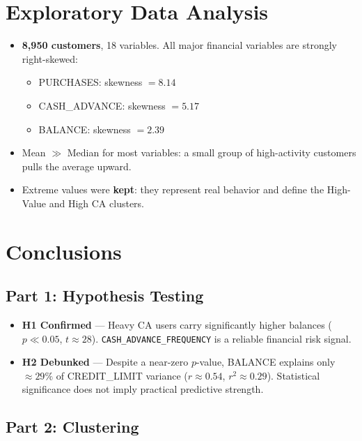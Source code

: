 \documentclass[12pt, letterpaper]{article}
\begin{document}
\section{Exploratory Data Analysis}

\begin{itemize}
  \item \textbf{8{,}950 customers}, 18 variables. All major financial variables
    are strongly right-skewed:
    \begin{itemize}
      \item PURCHASES: skewness $= 8.14$
      \item CASH\_ADVANCE: skewness $= 5.17$
      \item BALANCE: skewness $= 2.39$
    \end{itemize}
  \item Mean $\gg$ Median for most variables: a small group of high-activity
    customers pulls the average upward.
  \item Extreme values were \textbf{kept}: they represent real behavior and
    define the High-Value and High CA clusters.
\end{itemize}

\section{Conclusions}

\subsection{Part 1: Hypothesis Testing}

\begin{itemize}
  \item \textbf{H1 Confirmed} --- Heavy CA users carry significantly higher balances
    ($p \ll 0.05$, $t\approx28$). \texttt{CASH\_ADVANCE\_FREQUENCY} is a reliable
    financial risk signal.
  \item \textbf{H2 Debunked} --- Despite a near-zero $p$-value, BALANCE explains
    only $\approx29\%$ of CREDIT\_LIMIT variance ($r\approx0.54$, $r^2\approx0.29$).
    Statistical significance does not imply practical predictive strength.
\end{itemize}

\subsection{Part 2: Clustering}
\end{document}
